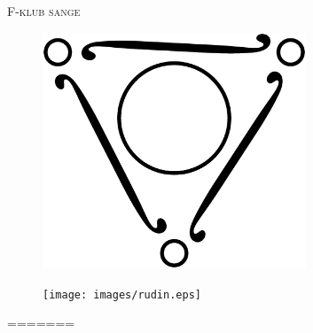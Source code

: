 \newpage
\begin{center}
{\Huge\textsc{F-klub sange}}
\end{center}
\begin{figure}[h!]
  \centering
    \includegraphics[width=0.7\textwidth]{images/fklubben.eps}
\end{figure}
\newpage

\newpage

\newpage
\begin{figure}[h!]
  \centering
    \texttt{[image: images/rudin.eps]}
\end{figure}
\newpage

\newpage

\newpage

\newpage

\newpage

\newpage

\newpage


\newpage

\newpage

\newpage

\vspace{1cm}

\newpage

\newpage

\newpage

\newpage

=======

\newpage

